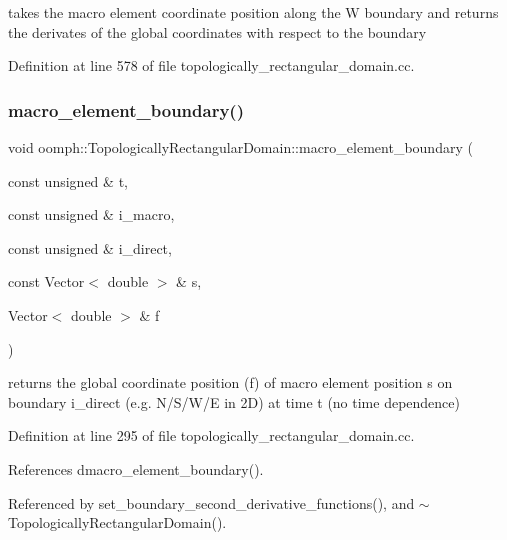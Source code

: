 takes the macro element coordinate position along the W boundary and returns the derivates of the global coordinates with respect to the boundary 



Definition at line 578 of file topologically\+\_\+rectangular\+\_\+domain.\+cc.

\mbox{\label{classoomph_1_1TopologicallyRectangularDomain_a4de4d505233303cee0690ee87e45b4cf}} 
\subsubsection{\texorpdfstring{macro\+\_\+element\+\_\+boundary()}{macro\_element\_boundary()}}
{\footnotesize\ttfamily void oomph\+::\+Topologically\+Rectangular\+Domain\+::macro\+\_\+element\+\_\+boundary (\begin{DoxyParamCaption}\item[{const unsigned \&}]{t,  }\item[{const unsigned \&}]{i\+\_\+macro,  }\item[{const unsigned \&}]{i\+\_\+direct,  }\item[{const Vector$<$ double $>$ \&}]{s,  }\item[{Vector$<$ double $>$ \&}]{f }\end{DoxyParamCaption})}

returns the global coordinate position (f) of macro element position s on boundary i\+\_\+direct (e.\+g. N/\+S/\+W/E in 2D) at time t (no time dependence) 

Definition at line 295 of file topologically\+\_\+rectangular\+\_\+domain.\+cc.



References dmacro\+\_\+element\+\_\+boundary().



Referenced by set\+\_\+boundary\+\_\+second\+\_\+derivative\+\_\+functions(), and $\sim$\+Topologically\+Rectangular\+Domain().

\mbox{\label{classoomph_1_1TopologicallyRectangularDomain_ab04f175b5baff51c457c51252880b1ff}} 

